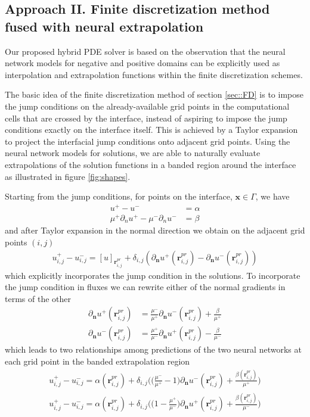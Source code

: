 \documentclass{elsarticle}
\begin{document}
\subsection{Approach II. Finite discretization method fused with neural extrapolation}
Our proposed hybrid PDE solver is based on the observation that the neural network models for negative and positive domains can be explicitly used as interpolation and extrapolation functions within the finite discretization schemes.  

The basic idea of the finite discretization method of section \ref{sec::FD} is to impose the jump conditions on the already-available grid points in the computational cells that are crossed by the interface, instead of aspiring to impose the jump conditions exactly on the interface itself. This is achieved by a Taylor expansion to project the interfacial jump conditions onto adjacent grid points. Using the neural network models for solutions, we are able to naturally evaluate extrapolations of the solution functions in a banded region around the interface as illustrated in figure \ref{fig:shapes}.


Starting from the jump conditions, for points on the interface, $\mathbf{x}\in \Gamma$, we have
\begin{align*}
u^+ - u^- &= \alpha\\
\mu^+\partial_n u^+ - \mu^- \partial_n u^- &= \beta
\end{align*}
and after Taylor expansion in the normal direction we obtain on the adjacent grid points $(i,j)$
\begin{align}
u^+_{i,j} - u^-_{i,j}=[u]_{\mathbf{r}_{i,j}^{pr}} + \delta_{i,j}(\partial_\mathbf{n}u^+(\mathbf{r}^{pr}_{i,j}) - \partial_\mathbf{n}u^-(\mathbf{r}^{pr}_{i,j})) \label{eq::taylorexpandjump}
\end{align}
which explicitly incorporates the jump condition in the solutions. To incorporate the jump condition in fluxes we can rewrite either of the normal gradients in terms of the other 
\begin{align*}
\partial_\mathbf{n}u^+(\mathbf{r}^{pr}_{i,j}) &= \frac{\mu^-}{\mu^+}\partial_\mathbf{n}u^-(\mathbf{r}^{pr}_{i,j}) + \frac{\beta}{\mu^+}\\
\partial_\mathbf{n}u^-(\mathbf{r}^{pr}_{i,j}) &= \frac{\mu^+}{\mu^-}\partial_\mathbf{n}u^+(\mathbf{r}^{pr}_{i,j}) - \frac{\beta}{\mu^-} 
\end{align*}
which leads to two relationships among predictions of the two neural networks at each grid point in the banded extrapolation region
\begin{align}
u^+_{i,j} - u^-_{i,j}=\alpha(\mathbf{r}_{i,j}^{pr}) + \delta_{i,j}\bigg(\big(\frac{\mu^-}{\mu^+}-1\big)\partial_\mathbf{n}u^-(\mathbf{r}^{pr}_{i,j}) + \frac{\beta(\mathbf{r}_{i,j}^{pr})}{\mu^+} \bigg)  \label{eq::extrapolate1}\\
u^+_{i,j} - u^-_{i,j}=\alpha(\mathbf{r}_{i,j}^{pr}) + \delta_{i,j}\bigg(\big(1-\frac{\mu^+}{\mu^-}\big)\partial_\mathbf{n}u^+(\mathbf{r}^{pr}_{i,j}) + \frac{\beta(\mathbf{r}_{i,j}^{pr})}{\mu^-} \bigg) \label{eq::extrapolate2}
\end{align}
\end{document}
